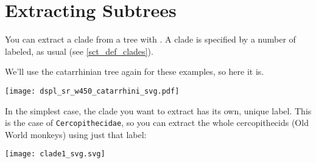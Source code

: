 

\section{Extracting Subtrees}
\label{sct_subtrees}

You can extract a clade from a tree with \clade. A clade is specified by a
number of labeled, as usual (see \ref{sct_def_clades}).

We'll use the catarrhinian tree again for these examples, so here it is.

\begin{center}
\texttt{[image: dspl\_sr\_w450\_catarrhini\_svg.pdf]}
\end{center}

 In the simplest case, the clade you want to extract has its own, unique label.
This is the case of \texttt{Cercopithecidae}, so you can extract the whole
cercopithecids (Old World monkeys) using just that label:


\begin{center}
  \texttt{[image: clade1\_svg.svg]}
\end{center}
